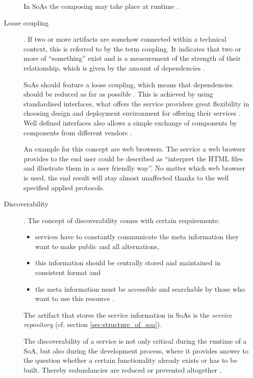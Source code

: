 \begin{description}
In SoAs the composing may take place at runtime \cite{breivold}.

\item [Loose coupling].
If two or more artifacts are somehow connected within a technical context, this is referred to by the term coupling. It indicates that two or more of ``something'' exist and is a measurement of the strength of their relationship, which is given by the amount of dependencies \cite{erl2008}.

SoAs should feature a loose coupling, which means that dependencies should be reduced as far as possible \cite{erl2008}. This is achieved by using standardised interfaces, what offers the service providers great flexibility in choosing design and deployment environment for offering their services \cite{breivold} \cite{arrowhead}. Well defined interfaces also allows a simple exchange of components by components from different vendors \cite{scholz}.

An example for this concept are web browsers. The service a web browser provides to the end user could be described as ``interpret the HTML files and illustrate them in a user friendly way''. No matter which web browser is used, the end result will stay almost unaffected thanks to the well specified applied protocols.

\item [Discoverability]. 
The concept of discoverability comes with certain requirements:
	\begin{itemize}
	\item services have to constantly communicate the meta information they want to make public and all alternations,
	\item this information should be centrally stored and maintained in consistent format and
	\item the meta information must be accessible and searchable by those who want to use this resource \cite[ch.12.]{erl2008}.
	\end{itemize}
The artifact that stores the service information in SoAs is the \emph{service repository} (cf. section \ref{sec:structure_of_soa}).

The discoverability of a service is not only critical during the runtime of a SoA, but also during the development process, where it provides answer to the question whether a certain functionality already exists or has to be built. Thereby redundancies are reduced or prevented altogether \cite[ch.12]{erl2008} \cite{arrowhead} \cite{breivold} \cite[p.27]{erl2011}.


\end{description}
